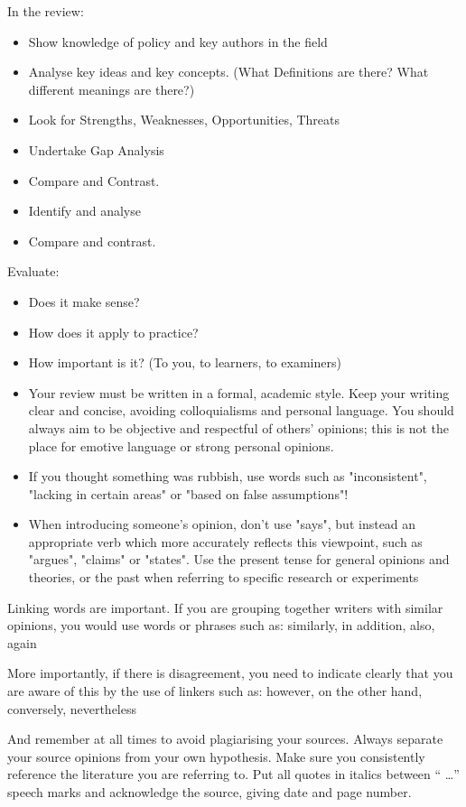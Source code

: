 In the review:
\begin{itemize}
\item{Show knowledge of policy and key authors in the field}
\item{Analyse key ideas and key concepts. (What Definitions are there? What different meanings are there?)}
\item{Look for Strengths, Weaknesses, Opportunities, Threats}
\item{Undertake Gap Analysis}
\item{Compare and Contrast. }
\item{Identify and analyse }
\item{Compare and contrast.}
\end{itemize}
Evaluate:
\begin{itemize}
\item{Does it make sense? }
\item{How does it apply to practice?}
\item{How important is it? (To you, to learners, to examiners)}
\item{Your review must be written in a formal, academic style. Keep your writing clear and concise, avoiding colloquialisms and personal language. You should always aim to be objective and respectful of others' opinions; this is not the place for emotive language or strong personal opinions. }
\item{If you thought something was rubbish, use words such as "inconsistent", "lacking in certain areas" or "based on false assumptions"! }
\item{When introducing someone's opinion, don't use "says", but instead an appropriate verb which more accurately reflects this viewpoint, such as "argues", "claims" or "states". Use the present tense for general opinions and theories, or the past when referring to specific research or experiments}
\end{itemize}
Linking words are important. If you are grouping together writers with similar opinions, you would use words or phrases such as: similarly, in addition, also, again

More importantly, if there is disagreement, you need to indicate clearly that you are aware of this by the use of linkers such as: however, on the other hand, conversely, nevertheless

And remember at all times to avoid plagiarising your sources. Always separate your source opinions from your own hypothesis. Make sure you consistently reference the literature you are referring to. Put all quotes in italics between “ …” speech marks and acknowledge the source, giving date and page number.